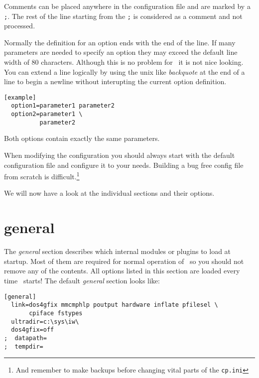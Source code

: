 Comments can be placed anywhere in the configuration file and are
marked by a \texttt{;}. The rest of the line starting from the
\texttt{;} is considered as a comment and not processed.

Normally the definition for an option ends with the end of the
line. If many parameters are needed to specify an option they may
exceed the default line width of 80 characters. Although this is no
problem for \cp\ it is not nice looking. You can extend a line
logically by using the unix like \emph{backquote} at the end of a line
to begin a newline without interupting the current option definition.
\begin{verbatim}
[example]
  option1=parameter1 parameter2
  option2=parameter1 \
          parameter2
\end{verbatim}
Both options contain exactly the same parameters.

When modifying the configuration you should always start with the
default configuration file and configure it to your needs. Building a
bug free config file from scratch is difficult.\footnote{And remember
to make backups before changing vital parts of the \texttt{cp.ini}}

We will now have a look at the individual sections and their options.

\section{general}
The \emph{general} section describes which internal modules or plugins
to load at startup. Most of them are required for normal operation of
\cp\ so you should not remove any of the contents. All options listed
in this section are loaded every time \cp\ starts!  The default
\emph{general} section looks like:

\begin{verbatim}
[general]
  link=dos4gfix mmcmphlp poutput hardware inflate pfilesel \
       cpiface fstypes
  ultradir=c:\sys\iw\  
  dos4gfix=off
;  datapath=   
;  tempdir=
\end{verbatim}

